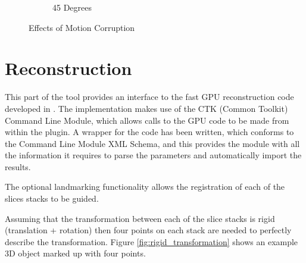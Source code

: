 \begin{figure}[H]
\begin{subfigure}[b]{0.32\textwidth}
    \caption{45 Degrees}\label{fig:scan_simulation_45_degrees}
  \end{subfigure}
  \caption{Effects of Motion Corruption}\label{fig:scan_simulation_movement_comparison}
\end{figure}


\clearpage
\section{Reconstruction}
This part of the tool provides an interface to the fast GPU reconstruction code developed in \cite{uncertaintysvd}. The implementation makes use of the CTK (Common Toolkit) Command Line Module\cite{ctkcmd}, which allows calls to the GPU code to be made from within the plugin. A wrapper for the code has been written, which conforms to the Command Line Module XML Schema, and this provides the module with all the information it requires to parse the parameters and automatically import the results.

The optional landmarking functionality allows the registration of each of the slices stacks to be guided.

Assuming that the transformation between each of the slice stacks is rigid (translation + rotation) then four points on each stack are needed to perfectly describe the transformation. Figure \ref{fig:rigid_transformation} shows an example 3D object marked up with four points.

